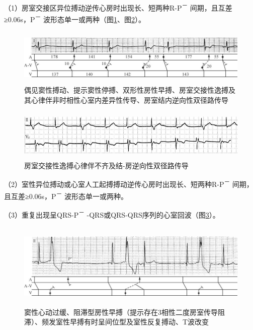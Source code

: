 （1）房室交接区异位搏动逆传心房时出现长、短两种R-P\textsuperscript{－}
间期，且互差≥0.06s，P\textsuperscript{－}
波形态单一或两种（图\ref{fig25-14}、图\ref{fig25-15}）。

\begin{figure}[!htbp]
 \centering
 \includegraphics[width=5.77083in,height=1.0625in]{./images/Image00425.jpg}
 \captionsetup{justification=centering}
 \caption{偶见窦性搏动、提示窦性停搏、双形性房性早搏、房室交接性逸搏及其心律伴非时相性心室内差异性传导、房室结内逆向性双径路传导}
 \label{fig25-14}
  \end{figure} 

\begin{figure}[!htbp]
 \centering
 \includegraphics[width=5.60417in,height=0.95833in]{./images/Image00426.jpg}
 \captionsetup{justification=centering}
 \caption{房室交接性逸搏心律伴不齐及结-房逆向性双径路传导}
 \label{fig25-15}
  \end{figure} 

（2）室性异位搏动或心室人工起搏搏动逆传心房时出现长、短两种R-P\textsuperscript{－}
间期，且互差≥0.06s，P\textsuperscript{－} 波形态单一或两种。

（3）重复出现呈QRS-P\textsuperscript{－}
-QRS或QRS-QRS序列的心室回波（图\ref{fig25-16}）。

\begin{figure}[!htbp]
 \centering
 \includegraphics[width=5.78125in,height=1.61458in]{./images/Image00427.jpg}
 \captionsetup{justification=centering}
 \caption{窦性心动过缓、阻滞型房性早搏（提示存在3相性二度房室传导阻滞）、频发室性早搏有时呈间位型及室性反复搏动、T波改变}
 \label{fig25-16}
  \end{figure} 

